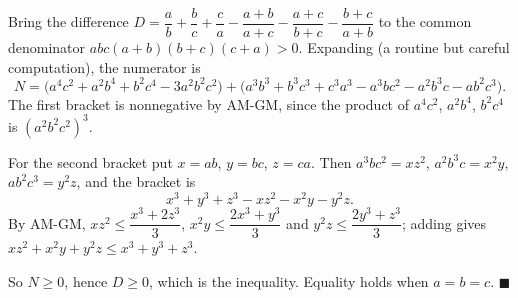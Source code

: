 Bring the difference $D=\dfrac {a}{b}+\dfrac {b}{c}+\dfrac {c}{a}-\dfrac{a+b}{a+c}-\dfrac{a+c}{b+c}-\dfrac{b+c}{a+b}$ to the common denominator $abc(a+b)(b+c)(c+a)>0$. Expanding (a routine but careful computation), the numerator is
\[
N=\bigl(a^4c^2+a^2b^4+b^2c^4-3a^2b^2c^2\bigr)+\bigl(a^3b^3+b^3c^3+c^3a^3-a^3bc^2-a^2b^3c-ab^2c^3\bigr).
\]
The first bracket is nonnegative by AM-GM, since the product of $a^4c^2$, $a^2b^4$, $b^2c^4$ is $(a^2b^2c^2)^3$.

For the second bracket put $x=ab$, $y=bc$, $z=ca$. Then $a^3bc^2=xz^2$, $a^2b^3c=x^2y$, $ab^2c^3=y^2z$, and the bracket is
\[
x^3+y^3+z^3-xz^2-x^2y-y^2z .
\]
By AM-GM, $xz^2\le\dfrac{x^3+2z^3}{3}$, $x^2y\le\dfrac{2x^3+y^3}{3}$ and $y^2z\le\dfrac{2y^3+z^3}{3}$; adding gives $xz^2+x^2y+y^2z\le x^3+y^3+z^3$.

So $N\ge0$, hence $D\ge0$, which is the inequality. Equality holds when $a=b=c$. $\blacksquare$
